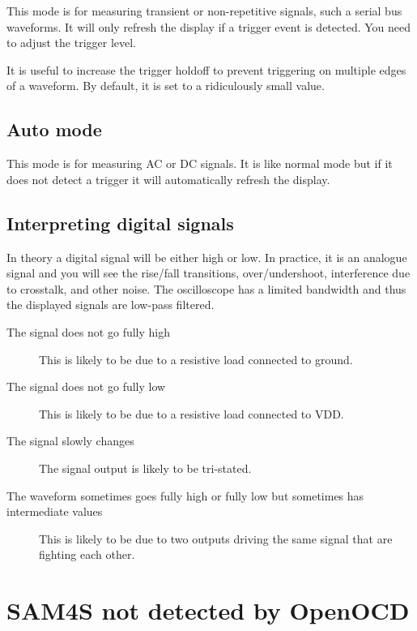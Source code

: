 This mode is for measuring transient or non-repetitive signals, such a
serial bus waveforms. It will only refresh the display if a trigger
event is detected.  You need to adjust the trigger level.

It is useful to increase the trigger holdoff to prevent triggering on
multiple edges of a waveform.  By default, it is set to a ridiculously
small value.

\subsection{Auto mode}
\label{auto-mode}

This mode is for measuring AC or DC signals. It is like normal mode
but if it does not detect a trigger it will automatically refresh the
display.


\subsection{Interpreting digital signals}

In theory a digital signal will be either high or low.  In practice,
it is an analogue signal and you will see the rise/fall transitions,
over/undershoot, interference due to crosstalk, and other noise.  The
oscilloscope has a limited bandwidth and thus the displayed signals
are low-pass filtered.

\begin{description}
  \item[The signal does not go fully high] This is likely to be due to
    a resistive load connected to ground.

  \item[The signal does not go fully low] This is likely to be due to
    a resistive load connected to VDD.

  \item[The signal slowly changes] The signal output is likely to be
    tri-stated.

  \item[The waveform sometimes goes fully high or fully low but
    sometimes has intermediate values] This is likely to be due to two
    outputs driving the same signal that are fighting each other.
\end{description}



\section{SAM4S not detected by OpenOCD}
\label{sam4s-not-detected-by-openocd}

